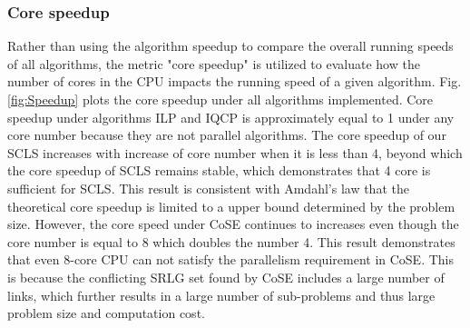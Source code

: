 \subsubsection{Core speedup}
Rather than using the algorithm speedup to compare the overall running speeds of all algorithms, the metric "core speedup" is utilized to evaluate how the number of cores in the CPU impacts the running speed of a given algorithm.
Fig.\ref{fig:Speedup} plots the core speedup under all algorithms implemented.
Core speedup under algorithms ILP and IQCP is  approximately equal to 1 under any core number because they are not parallel algorithms. The core speedup of our SCLS increases with increase of core number when it is less than 4, beyond which the core speedup of SCLS remains stable, which demonstrates that 4 core is sufficient for SCLS. This result is consistent with Amdahl's law\cite{amdahl1967validity} that the theoretical core speedup is limited to a upper bound determined by the problem size. However, the core speed under CoSE continues to increases even though the core number is  equal to 8 which doubles the number 4. This result demonstrates that even 8-core CPU can not satisfy the parallelism requirement in CoSE. This is because the conflicting SRLG set found by CoSE includes  a large number of links,  which further results in a large number of sub-problems  and thus large problem size and  computation cost.


%

